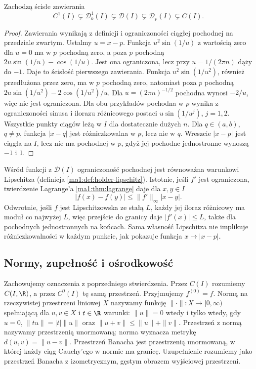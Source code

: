 \begin{stwierdzenie}
\label{ma1:prop:differentiable-function-hierarchy}
Zachodzą ścisłe zawierania
\[
 C^1(I)\subsetneq\mathcal D_b^1(I)
 \subsetneq\mathcal D(I)
 \subsetneq\mathcal D_p(I)\subsetneq C(I).
\]
\end{stwierdzenie}
\begin{proof}
Zawierania wynikają z definicji i ograniczoności
ciągłej pochodnej na przedziale zwartym.
Ustalmy $u=x-p$. Funkcja $u^2\sin(1/u)$
z wartością zero dla $u=0$ ma w $p$ pochodną zero,
a poza $p$ pochodną
$2u\sin(1/u)-\cos(1/u)$. Jest ona ograniczona,
lecz przy $u=1/(2\pi n)$ dąży do $-1$.
Daje to ścisłość pierwszego zawierania.
Funkcja $u^2\sin(1/u^2)$, również przedłużona
przez zero, ma w $p$ pochodną zero, natomiast
poza $p$ pochodną $2u\sin(1/u^2)-2\cos(1/u^2)/u$.
Dla $u=(2\pi n)^{-1/2}$ pochodna wynosi $-2/u$,
więc nie jest ograniczona. Dla obu przykładów
pochodna w $p$ wynika z ograniczoności sinusa
i ilorazu różnicowego postaci $u\sin(1/u^j)$,
$j=1,2$. Wszystkie punkty ciągów leżą w $I$
dla dostatecznie dużych $n$.
Dla $q\in(a,b)$, $q\ne p$, funkcja $|x-q|$
jest różniczkowalna w $p$, lecz nie w $q$.
Wreszcie $|x-p|$ jest ciągła na $I$, lecz nie
ma pochodnej w $p$, gdyż jej pochodne jednostronne
wynoszą $-1$ i $1$.
\end{proof}

Wśród funkcji z $\mathcal D(I)$ ograniczoność
pochodnej jest równoważna warunkowi Lipschitza
(definicja \ref{ma1:def:holder-lipschitz}).
Istotnie, jeśli $f'$ jest ograniczona,
twierdzenie Lagrange'a
\ref{ma1:thm:lagrange} daje dla $x,y\in I$
\[
 |f(x)-f(y)|\le \|f'\|_\infty |x-y|.
\]
Odwrotnie, jeśli $f$ jest Lipschitzowska ze
stałą $L$, każdy jej iloraz różnicowy ma
moduł co najwyżej $L$, więc przejście do
granicy daje $|f'(x)|\le L$, także dla
pochodnych jednostronnych na końcach.
Sama własność Lipschitza nie implikuje
różniczkowalności w każdym punkcie,
jak pokazuje funkcja $x\mapsto |x-p|$.

\subsection{Normy, zupełność i ośrodkowość}

Zachowujemy oznaczenia z poprzedniego stwierdzenia.
Przez $C(I)$ rozumiemy $C(I,\R)$, a przez $C^0(I)$
tę samą przestrzeń. Przyjmujemy $f^{(0)}=f$.
Normą na rzeczywistej przestrzeni liniowej $X$
nazywamy funkcję $\|\cdot\|:X\to[0,\infty)$
spełniającą dla $u,v\in X$ i $t\in\R$ warunki:
$\|u\|=0$ wtedy i tylko wtedy, gdy $u=0$,
$\|tu\|=|t|\|u\|$ oraz
$\|u+v\|\le\|u\|+\|v\|$.
Przestrzeń z normą nazywamy przestrzenią unormowaną;
norma wyznacza metrykę $d(u,v)=\|u-v\|$.
Przestrzeń Banacha jest przestrzenią unormowaną,
w której każdy ciąg Cauchy'ego w normie ma granicę.
Uzupełnienie rozumiemy jako przestrzeń Banacha
z izometrycznym, gęstym obrazem wyjściowej przestrzeni.

